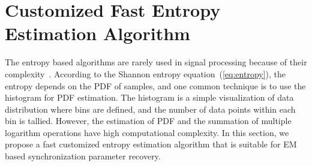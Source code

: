 \documentclass[journal,comsoc]{IEEEtran}
\begin{document}
\section{Customized Fast Entropy Estimation Algorithm}
\label{sec:adhoc}
The entropy based algorithms are rarely used in signal processing because of their complexity~\cite{Bercher2000}.
According to the Shannon entropy equation~(\ref{eq:entropy}), the entropy depends on the PDF of samples, and one common technique is to use the histogram for PDF estimation.
The histogram is a simple visualization of data distribution where bins are defined, and the number of data points within each bin is tallied. 
However, the estimation of PDF and the summation of multiple logarithm operations have high computational complexity.
In this section, we propose a fast customized entropy estimation algorithm that is suitable for EM based synchronization parameter recovery. 
\end{document}
